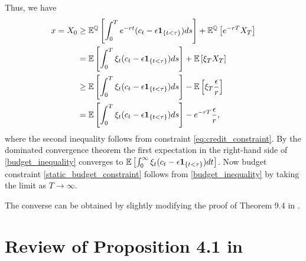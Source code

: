 \documentclass[a4paper,report, 11pt]{article}
\def\e{\epsilon}
\begin{document}
Thus, we have 
\begin{align}
x=X_0 &\geq \mathbb{E}^{\mathbb{Q}} \left[\int_0^T e^{-rt} (c_t- \e {\bf 1}_{\{t<\tau\}})ds\right] +\mathbb{E}^{\mathbb{Q}} \left[e^{-rT} X_T\right]\nonumber \\
&= \mathbb{E}\left[\int_0^T \xi_t (c_t- \e {\bf 1}_{\{t<\tau\}})ds\right] +\mathbb{E}\left[\xi_T X_T\right]\nonumber \\
&\geq \mathbb{E} \left[\int_0^T \xi_t(c_t- \e {\bf 1}_{\{t<\tau\}})ds\right] -\mathbb{E} \left[\xi_T \frac{\e}{r} \right]\nonumber \\
&=\mathbb{E} \left[\int_0^T \xi_t (c_t- \e {\bf 1}_{\{t<\tau\}})ds\right] -e^{-rT}\frac{\e}{r},\label{budget_inequality}
\end{align}
where the second inequality follows from constraint \eqref{eq:credit_constraint}. By the dominated convergence theorem the first expectation in the right-hand side of \eqref{budget_inequality} converges to $\mathbb{E} \left[\int_0^{\infty} \xi_t (c_t- \e {\bf 1}_{\{t<\tau\}})dt\right]$. Now budget constraint \eqref{static_budget_constraint} follows from \eqref{budget_inequality} by taking the limit as $T\to\infty$.
 
{The converse can be obtained by  slightly modifying the proof of Theorem 9.4 in \citet{KS}.}


\section{Review of Proposition 4.1 in \citet{KMZ}}\label{sec:KMZ}

\end{document}

